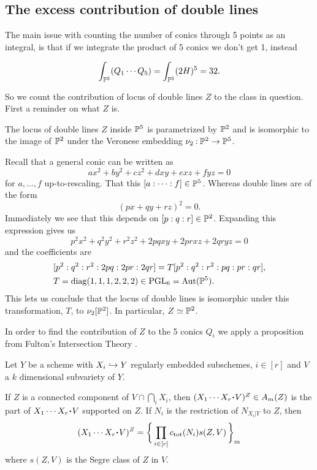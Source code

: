 \documentclass[12pt]{memoir}
\begin{document}

\subsection{The excess contribution of double lines}

The main issue with counting the number of conics through 5 points as an integral, is that if we integrate the product of 5 conics we don't get 1, instead

\[
    \int_{\mathbb{P}^5}(Q_1\cdots Q_5)=\int_{\mathbb{P}^5}(2H)^5=32.
\]

So we count the contribution of locus of double lines \(Z\) to the class in question. First a reminder on what \(Z\) is.

\begin{Lem}
    The locus of double lines \(Z\) inside \(\mathbb{P}^5\) is parametrized by \(\mathbb{P}^2\) and is isomorphic to the image of \(\mathbb{P}^2\) under the Veronese embedding \(\nu_2\mathbin{:}\mathbb{P}^2\to\mathbb{P}^5\).
\end{Lem}

\begin{ptcbp}
    Recall that a general conic can be written as
    \[
        ax^2+by^2+cz^2+dxy+exz+fyz=0
    \]
    for \(a,\dots,f\) up-to-rescaling. That this \([a:\dots:f]\in\mathbb{P}^5\). Whereas double lines are of the form
    \[
        (px+qy+rz)^2=0.
    \]
    Immediately we see that this depends on \([p:q:r]\in\mathbb{P}^2\).
    Expanding this expression gives us
    \[
        p^2x^2+q^2y^2+r^2z^2+2pqxy+2prxz+2qryz=0
    \]
    and the coefficients are
    \begin{align*}
         & [p^2:q^2:r^2:2pq:2pr:2qr]=T[p^2:q^2:r^2:pq:pr:qr], \\
         & T=\operatorname{diag}(1,1,1,2,2,2)\in\operatorname{PGL}_6=\operatorname{Aut}(\mathbb{P}^5).
    \end{align*}
    This lets us conclude that the locus of double lines is isomorphic under this transformation, \(T\), to \(\nu_2[\mathbb{P}^2]\). In particular, \(Z\simeq\mathbb{P}^2\).
\end{ptcbp}

In order to find the contribution of \(Z\) to the 5 conics \(Q_i\) we apply a proposition from Fulton's Intersection Theory \cite{FultonIntersectionTheory}.

\begin{Prop}
    Let \(Y\) be a scheme with \(X_i\hookrightarrow Y\) regularly embedded subschemes, \(i\in[r]\) and \(V\) a \(k\) dimensional subvariety of \(Y\).\par
    If \(Z\) is a connected component of \(V\cap\bigcap_iX_i\), then
    \((X_1\cdots X_r\.V)^Z\in A_m(Z)\)
    is the part of \(X_1\cdots X_r\.V\) supported on \(Z\). If \(N_i\) is the restriction of \(N_{X_i|Y}\) to \(Z\), then
    \[
        (X_1\cdots X_r\.V)^Z=\Set{\prod_{i\in[r]}c_{\tot}(N_i)s(Z,V)}_m
    \]
    where \(s(Z,V)\) is the Segre class of \(Z\) in \(V\).
\end{Prop}
\end{document}
